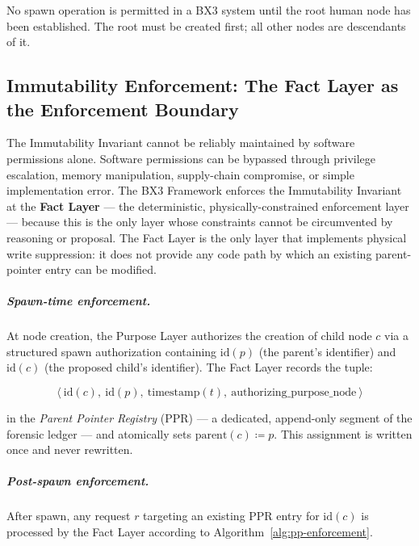 No spawn operation is permitted in a BX3 system until the root human node has been established. The root must be created first; all other nodes are descendants of it.

\subsection{Immutability Enforcement: The Fact Layer as the Enforcement Boundary}
\label{sec:fact-layer-enforcement}

The Immutability Invariant cannot be reliably maintained by software permissions alone. Software permissions can be bypassed through privilege escalation, memory manipulation, supply-chain compromise, or simple implementation error. The BX3 Framework enforces the Immutability Invariant at the \textbf{Fact Layer} --- the deterministic, physically-constrained enforcement layer --- because this is the only layer whose constraints cannot be circumvented by reasoning or proposal. The Fact Layer is the only layer that implements physical write suppression: it does not provide any code path by which an existing parent-pointer entry can be modified.

\subparagraph{Spawn-time enforcement.}
At node creation, the Purpose Layer authorizes the creation of child node $c$ via a structured spawn authorization containing $\text{id}(p)$ (the parent's identifier) and $\text{id}(c)$ (the proposed child's identifier). The Fact Layer records the tuple:

\begin{equation}
\langle\ \text{id}(c),\ \text{id}(p),\ \text{timestamp}(t),\ \text{authorizing\_purpose\_node}\ \rangle
\label{eq:ppr-tuple}
\end{equation}

in the \textit{Parent Pointer Registry} (PPR) --- a dedicated, append-only segment of the forensic ledger --- and atomically sets $\text{parent}(c) \coloneqq p$. This assignment is written once and never rewritten.

\subparagraph{Post-spawn enforcement.}
After spawn, any request $r$ targeting an existing PPR entry for $\text{id}(c)$ is processed by the Fact Layer according to Algorithm~\ref{alg:pp-enforcement}.


